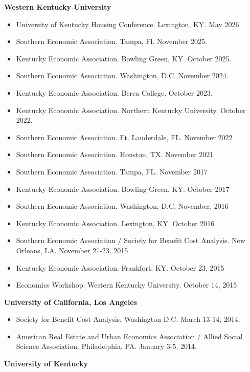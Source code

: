 \documentclass[10pt]{article}
\begin{document}
\textbf{Western Kentucky University}

\medskip

\begin{itemize}
    \item University of Kentucky Housing Conference. Lexington, KY. May 2026.
    \item Southern Economic Association. Tampa, Fl. November 2025.
    \item Kentucky Economic Association. Bowling Green, KY. October 2025.
    \item Southern Economic Association. Washington, D.C. November 2024.    
    \item Kentucky Economic Association. Berea College. October 2023.
    \item Kentucky Economic Association. Northern Kentucky University. October 2022.
    \item Southern Economic Association. Ft. Lauderdale, FL. November 2022
    \item Southern Economic Association. Houston, TX. November 2021
    \item Southern Economic Association. Tampa, FL. November 2017
    \item Kentucky Economic Association. Bowling Green, KY. October 2017
    \item Southern Economic Association. Washington, D.C. November, 2016
    \item Kentucky Economic Association. Lexington, KY. October 2016
    \item Southern Economic Association /  Society for Benefit Cost Analysis. New Orleans, LA. November 21-23, 2015
    \item Kentucky Economic Association. Frankfort, KY. October 23, 2015
    \item Economics Workshop. Western Kentucky University. October 14, 2015
\end{itemize}

\textbf{University of California, Los Angeles}

\medskip

\begin{itemize}
\item Society for Benefit Cost Analysis. Washington D.C. March 13-14, 2014.
\item American Real Estate and Urban Economics Association / Allied Social Science Association. Philadelphia, PA. January 3-5, 2014.
\end{itemize}

\textbf{University of Kentucky}
\end{document}
